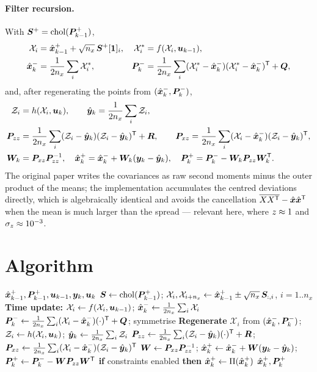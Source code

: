 \paragraph{Filter recursion.} With $\bm{S}^+ = \operatorname{chol}(\bm{P}^{+}_{k-1})$,
\begin{align}
\mathcal{X}_i &= \hat{\bm{x}}^{+}_{k-1} + \sqrt{n_x}\,\bm{S}^+[\bm{1}]_i, &
\mathcal{X}^*_i &= f(\mathcal{X}_i,\bm{u}_{k-1}), \label{eq:ckf-tu1}\\
\hat{\bm{x}}^{-}_k &= \frac{1}{2n_x}\sum_i \mathcal{X}^*_i, &
\bm{P}^{-}_k &= \frac{1}{2n_x}\sum_i(\mathcal{X}^*_i-\hat{\bm{x}}^{-}_k)(\mathcal{X}^*_i-\hat{\bm{x}}^{-}_k)^{\mathsf{T}} + \bm{Q},
\label{eq:ckf-tu2}
\end{align}
and, after regenerating the points from $(\hat{\bm{x}}^{-}_k,\bm{P}^{-}_k)$,
\begin{align}
\mathcal{Z}_i &= h(\mathcal{X}_i,\bm{u}_k), \qquad \hat{\bm{y}}_k = \frac{1}{2n_x}\sum_i \mathcal{Z}_i,
\label{eq:ckf-mu1}\\
\bm{P}_{zz} &= \frac{1}{2n_x}\sum_i(\mathcal{Z}_i-\hat{\bm{y}}_k)(\mathcal{Z}_i-\hat{\bm{y}}_k)^{\mathsf{T}} + \bm{R},
\qquad
\bm{P}_{xz} = \frac{1}{2n_x}\sum_i(\mathcal{X}_i-\hat{\bm{x}}^{-}_k)(\mathcal{Z}_i-\hat{\bm{y}}_k)^{\mathsf{T}},
\label{eq:ckf-mu2}\\
\bm{W}_k &= \bm{P}_{xz}\bm{P}_{zz}^{-1}, \quad
\hat{\bm{x}}^{+}_k = \hat{\bm{x}}^{-}_k + \bm{W}_k(\bm{y}_k-\hat{\bm{y}}_k), \quad
\bm{P}^{+}_k = \bm{P}^{-}_k - \bm{W}_k\bm{P}_{zz}\bm{W}_k^{\mathsf{T}}.
\label{eq:ckf-mu3}
\end{align}
The original paper writes the covariances as raw second moments minus the outer product of
the means; the implementation accumulates the centred deviations directly, which is
algebraically identical and avoids the cancellation $\overline{XX^{\mathsf{T}}}-\hat{\bm{x}}\hat{\bm{x}}^{\mathsf{T}}$ when the
mean is much larger than the spread --- relevant here, where $z\approx 1$ and
$\sigma_z\approx 10^{-3}$.

\section{Algorithm}
\begin{algorithm}[H]
\caption{CKF --- one sampling period (additive noise)}
\begin{algorithmic}[1]
\Require $\hat{\bm{x}}^{+}_{k-1},\bm{P}^{+}_{k-1},\bm{u}_{k-1},\bm{y}_k,\bm{u}_k$
\State $\bm{S}\gets\operatorname{chol}(\bm{P}^{+}_{k-1})$;\;
       $\mathcal{X}_{i},\mathcal{X}_{i+n_x}\gets\hat{\bm{x}}^{+}_{k-1}\pm\sqrt{n_x}\,\bm{S}_{:,i}$, $i=1..n_x$
\State \textbf{Time update:} $\mathcal{X}_i\gets f(\mathcal{X}_i,\bm{u}_{k-1})$;\;
       $\hat{\bm{x}}^{-}_k\gets\frac{1}{2n_x}\sum_i\mathcal{X}_i$
\State $\bm{P}^{-}_k\gets\frac{1}{2n_x}\sum_i(\mathcal{X}_i-\hat{\bm{x}}^{-}_k)(\cdot)^{\mathsf{T}}+\bm{Q}$; symmetrise
\State \textbf{Regenerate} $\mathcal{X}_i$ from $(\hat{\bm{x}}^{-}_k,\bm{P}^{-}_k)$;\;
       $\mathcal{Z}_i\gets h(\mathcal{X}_i,\bm{u}_k)$;\; $\hat{\bm{y}}_k\gets\frac{1}{2n_x}\sum_i\mathcal{Z}_i$
\State $\bm{P}_{zz}\gets\frac{1}{2n_x}\sum_i(\mathcal{Z}_i-\hat{\bm{y}}_k)(\cdot)^{\mathsf{T}}+\bm{R}$;\;
       $\bm{P}_{xz}\gets\frac{1}{2n_x}\sum_i(\mathcal{X}_i-\hat{\bm{x}}^{-}_k)(\mathcal{Z}_i-\hat{\bm{y}}_k)^{\mathsf{T}}$
\State $\bm{W}\gets\bm{P}_{xz}\bm{P}_{zz}^{-1}$;\; $\hat{\bm{x}}^{+}_k\gets\hat{\bm{x}}^{-}_k+\bm{W}(\bm{y}_k-\hat{\bm{y}}_k)$;\;
       $\bm{P}^{+}_k\gets\bm{P}^{-}_k-\bm{W}\bm{P}_{zz}\bm{W}^{\mathsf{T}}$
\State \textbf{if} constraints enabled \textbf{then} $\hat{\bm{x}}^{+}_k\gets\Pi(\hat{\bm{x}}^{+}_k)$
\Ensure $\hat{\bm{x}}^{+}_k,\bm{P}^{+}_k$
\end{algorithmic}
\end{algorithm}

